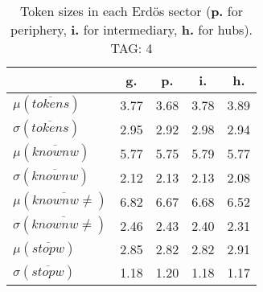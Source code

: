 \begin{table}[h!]
\begin{center}
\begin{tabular}{| l || c | c | c | c |}\hline
 & {\bf g.} & {\bf p.} & {\bf i.} & {\bf h.} \\\hline\hline
$\mu(\overline{tokens})$ & 3.77  & 3.68  & 3.78  & 3.89 \\
$\sigma(\overline{tokens})$ & 2.95  & 2.92  & 2.98  & 2.94 \\\hline
$\mu(\overline{knownw})$ & 5.77  & 5.75  & 5.79  & 5.77 \\
$\sigma(\overline{knownw})$ & 2.12  & 2.13  & 2.13  & 2.08 \\\hline
$\mu(\overline{knownw \neq})$ & 6.82  & 6.67  & 6.68  & 6.52 \\
$\sigma(\overline{knownw \neq})$ & 2.46  & 2.43  & 2.40  & 2.31 \\\hline
$\mu(\overline{stopw})$ & 2.85  & 2.82  & 2.82  & 2.91 \\
$\sigma(\overline{stopw})$ & 1.18  & 1.20  & 1.18  & 1.17 \\\hline
\end{tabular}
\caption{Token sizes in each Erd\"os sector ({{\bf p.}} for periphery, {{\bf i.}} for intermediary, {{\bf h.}} for hubs). TAG: 4}
\end{center}
\end{table}
